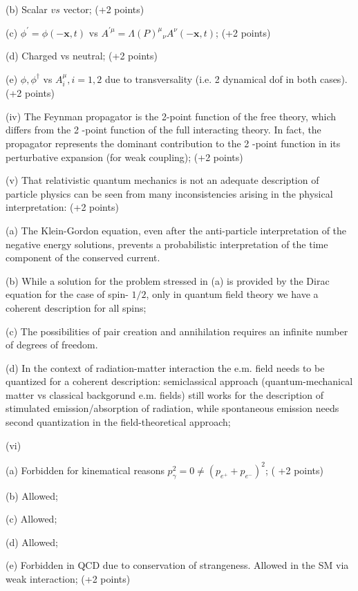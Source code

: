 \documentclass[10pt, letterpaper]{article}
\begin{document}
(b) Scalar $v s$ vector; (+2 points)

(c) $\phi^{\prime}=\phi(-\mathbf{x}, t)$ vs $A^{\prime \mu}=\Lambda(P)^\mu{ }_\nu A^\nu(-\mathbf{x}, t)$; (+2 points)

(d) Charged vs neutral; (+2 points)

(e) $\phi, \phi^{\dagger}$ vs $A_i^\mu, i=1,2$ due to transversality (i.e. 2 dynamical dof in both cases). (+2 points)



(iv) The Feynman propagator is the 2-point function of the free theory, which differs from the 2 -point function of the full interacting theory. In fact, the propagator represents the dominant contribution to the 2 -point function in its perturbative expansion (for weak coupling); (+2 points)


(v) That relativistic quantum mechanics is not an adequate description of particle physics can be seen from many inconsistencies arising in the physical interpretation: (+2 points)

(a) The Klein-Gordon equation, even after the anti-particle interpretation of the negative energy solutions, prevents a probabilistic interpretation of the time component of the conserved current.

(b) While a solution for the problem stressed in (a) is provided by the Dirac equation for the case of spin- $1 / 2$, only in quantum field theory we have a coherent description for all spins;

(c) The possibilities of pair creation and annihilation requires an infinite number of degrees of freedom.

(d) In the context of radiation-matter interaction the e.m. field needs to be quantized for a coherent description: semiclassical approach (quantum-mechanical matter vs classical backgorund e.m. fields) still works for the description of stimulated emission/absorption of radiation, while spontaneous emission needs second quantization in the field-theoretical approach;


(vi) 

(a) Forbidden for kinematical reasons $p_\gamma^2=0 \neq\left(p_{e^{+}}+p_{e^{-}}\right)^2$; ( +2 points)

(b) Allowed;

(c) Allowed;

(d) Allowed;

(e) Forbidden in QCD due to conservation of strangeness. Allowed in the SM via weak interaction; (+2 points)
\end{document}
